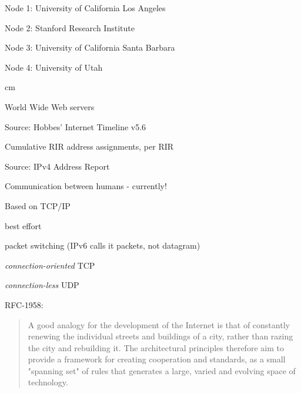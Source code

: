 \documentclass[Screen16to9,17pt]{foils}
\begin{document}

\begin{list2}
\item Node 1: University of California Los Angeles
\item Node 2: Stanford Research Institute
\item Node 3: University of California Santa Barbara
\item Node 4: University of Utah
\end{list2}


 cm

\centerline{World Wide Web servers}


\begin{list1}
\item Source: Hobbes' Internet Timeline v5.6
\end{list1}


\centerline{Cumulative RIR address assignments, per RIR}

\begin{list1}
\item Source:
IPv4 Address Report 
\end{list1}


\begin{list1}
\item Communication between humans - currently!
\item Based on TCP/IP
\begin{list2}
\item best effort
\item packet switching (IPv6 calls it packets, not datagram)
\item \emph{connection-oriented} TCP
\item \emph{connection-less} UDP
\end{list2}
\end{list1}

RFC-1958:
\begin{quote}
 A good analogy for the development of the Internet is that of
 constantly renewing the individual streets and buildings of a city,
 rather than razing the city and rebuilding it. The architectural
 principles therefore aim to provide a framework for creating
 cooperation and standards, as a small "spanning set" of rules that
 generates a large, varied and evolving space of technology.
\end{quote}
\end{document}
